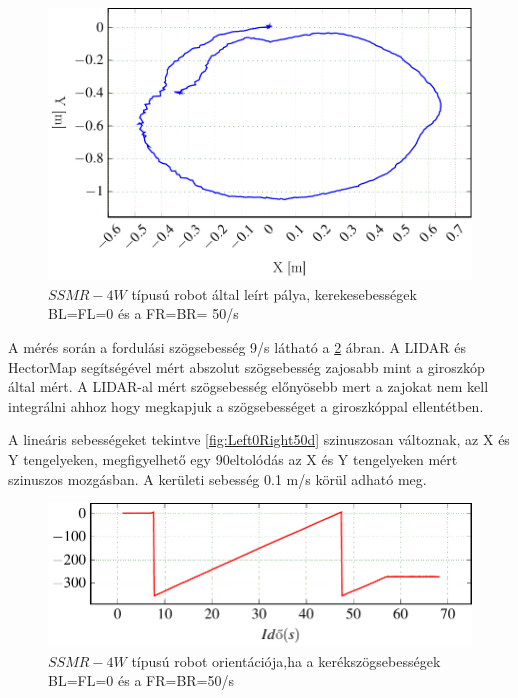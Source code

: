 \begin{figure}[H]
	\begin{center}
  		\includegraphics[scale=1]{tikz/Left0Right50b.pdf}
  	\end{center}
  \caption{$SSMR-4W$ típusú robot által leírt pálya, kerekesebességek BL=FL=0 és a FR=BR= 50\degree/s}
  \renewcommand{\figlabel}{Left0Right50b}
  \label{fig:Left0Right50b}
\end{figure}

A mérés során a fordulási szögsebesség 9\degree/s látható a \ref{fig:Left0Right50c} ábran. A LIDAR és HectorMap segítségével mért abszolut szögsebesség zajosabb mint a giroszkóp által mért. A LIDAR-al mért szögsebesség előnyösebb mert a zajokat nem kell integrálni ahhoz hogy megkapjuk a szögsebességet a giroszkóppal ellentétben.

A lineáris sebességeket tekintve \ref{fig:Left0Right50d} szinuszosan változnak, az X és Y tengelyeken, megfigyelhető egy 90\degree eltolódás az X és Y tengelyeken mért szinuszos mozgásban. A kerületi sebesség 0.1 m/s körül adható meg.

\begin{figure}[H]
	\begin{center}
  		\includegraphics[scale=1]{tikz/Left0Right50c.pdf}
  	\end{center}
  \caption{$SSMR-4W$ típusú robot orientációja,ha a kerékszögsebességek BL=FL=0 és a FR=BR=50\degree/s}
  \label{fig:Left0Right50c}
\end{figure}


